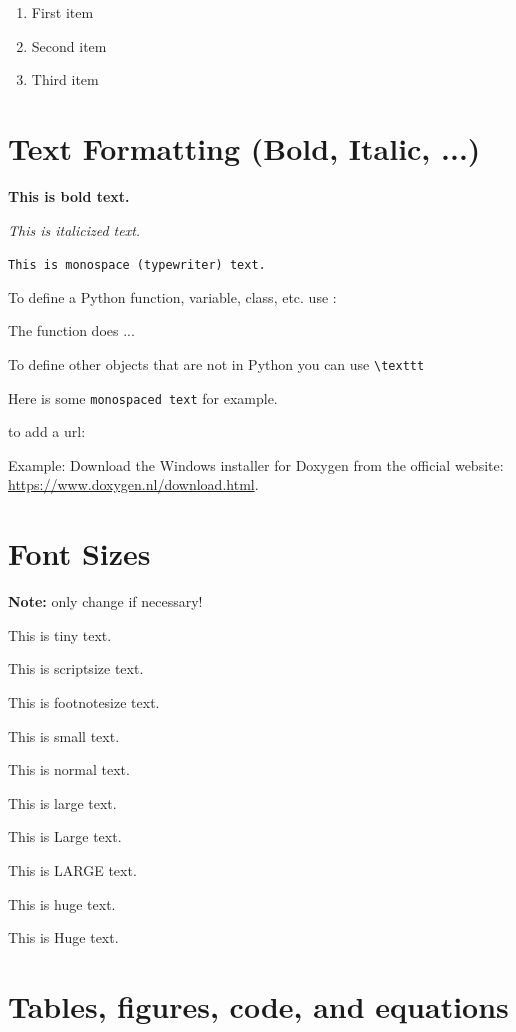\begin{enumerate}
	\item First item
	\item Second item
	\item Third item
\end{enumerate}


\section{Text Formatting (Bold, Italic, ...)}

\textbf{This is bold text.}

\emph{This is italicized text.}

\texttt{This is monospace (typewriter) text.}

To define a Python function, variable, class, etc. use : 

The  function does ...

To define other objects that are not in Python you can use \texttt{\textbackslash texttt}

Here is some \texttt{monospaced text} for example.

to add a url:

Example: Download the Windows installer for Doxygen from the official website: \url{https://www.doxygen.nl/download.html}.


\section{Font Sizes}

\textbf{Note:} only change if necessary!

{\tiny This is tiny text.}

{\scriptsize This is scriptsize text.}

{\footnotesize This is footnotesize text.}

{\small This is small text.}

{\normalsize This is normal text.}

{\large This is large text.}

{\Large This is Large text.}

{\LARGE This is LARGE text.}

{\huge This is huge text.}

{\Huge This is Huge text.}


\section{Tables, figures, code, and equations}


